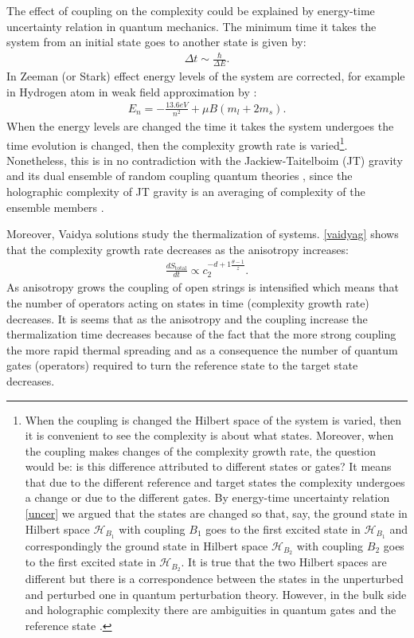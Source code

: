 \documentclass[]{article}
\begin{document}
The effect of coupling on the complexity could be explained by energy-time uncertainty relation in quantum mechanics. The minimum time it takes the system from an initial state goes to another state is given by:
\begin{align}
\Delta t\sim \frac{\hbar}{\Delta E}.\label{uncer}
\end{align}
In Zeeman (or Stark) effect energy levels of the system are corrected, for example in Hydrogen atom in weak field approximation by \cite{gri}:
\begin{align}
E_n=-\frac{13.6eV}{n^2}+\mu B(m_l+2m_s).\label{energy}
\end{align}
When the energy levels are changed the time it takes the system undergoes the time evolution is changed, then the complexity growth rate is varied\footnote{When the coupling is changed the Hilbert space of the system is varied, then it is convenient to see the complexity is about what states. Moreover, when the coupling makes changes of the complexity growth rate, the question would be: is this difference attributed to different states or gates? It means that due to the different reference and target states the complexity undergoes a change or due to the different gates. By energy-time uncertainty relation \eqref{uncer} we argued that the states are changed so that, say, the ground state in Hilbert space $\mathcal{H}_{B_1}$ with coupling $B_1$ goes to the first excited state in $\mathcal{H}_{B_1}$ and correspondingly the ground state in Hilbert space $\mathcal{H}_{B_2}$ with coupling $B_2$ goes to the first excited state in $\mathcal{H}_{B_2}$. It is true that the two Hilbert spaces are different but there is a correspondence between the states in the unperturbed and perturbed one in quantum perturbation theory. However, in the bulk side and holographic complexity there are ambiguities in quantum gates and the reference state \cite{anything}.}. 
Nonetheless, this is in no contradiction with the Jackiew-Taitelboim (JT) gravity and its dual ensemble of random coupling quantum theories \cite{random}, since the holographic complexity of JT gravity is an averaging of complexity of the  ensemble members \cite{averaging}.

Moreover, Vaidya solutions study the thermalization of systems. \eqref{vaidyag} shows that the complexity growth rate decreases as the anisotropy increases:
\begin{align}
\frac{dS_{\text{total}}}{dt}\propto c_2^{-d+1\frac{\theta-1}{z}}.
\end{align}
As anisotropy grows the coupling of open strings is intensified which means that the number of operators acting on states in time (complexity growth rate) decreases. It is seems that as the anisotropy and the coupling increase the thermalization time decreases \cite{aref} because of the fact that the more strong coupling the more rapid thermal spreading and as a consequence the number of quantum gates (operators) required to turn the reference state to the target state decreases.
\end{document}
